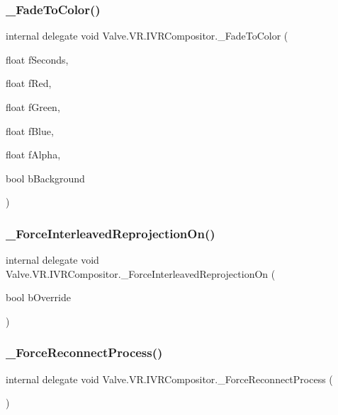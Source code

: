 \subsubsection{\texorpdfstring{\_FadeToColor()}{\_FadeToColor()}}
{\footnotesize\ttfamily internal delegate void Valve.\+V\+R.\+I\+V\+R\+Compositor.\+\_\+\+Fade\+To\+Color (\begin{DoxyParamCaption}\item[{float}]{f\+Seconds,  }\item[{float}]{f\+Red,  }\item[{float}]{f\+Green,  }\item[{float}]{f\+Blue,  }\item[{float}]{f\+Alpha,  }\item[{bool}]{b\+Background }\end{DoxyParamCaption})}

\mbox{\label{struct_valve_1_1_v_r_1_1_i_v_r_compositor_a36094af51a8c04b9a3e162457ce669b9}} 
\subsubsection{\texorpdfstring{\_ForceInterleavedReprojectionOn()}{\_ForceInterleavedReprojectionOn()}}
{\footnotesize\ttfamily internal delegate void Valve.\+V\+R.\+I\+V\+R\+Compositor.\+\_\+\+Force\+Interleaved\+Reprojection\+On (\begin{DoxyParamCaption}\item[{bool}]{b\+Override }\end{DoxyParamCaption})}

\mbox{\label{struct_valve_1_1_v_r_1_1_i_v_r_compositor_a41854e10b434af0c1747fdb05b91098f}} 
\subsubsection{\texorpdfstring{\_ForceReconnectProcess()}{\_ForceReconnectProcess()}}
{\footnotesize\ttfamily internal delegate void Valve.\+V\+R.\+I\+V\+R\+Compositor.\+\_\+\+Force\+Reconnect\+Process (\begin{DoxyParamCaption}{ }\end{DoxyParamCaption})}

